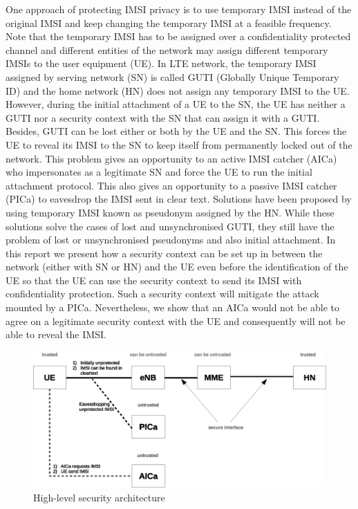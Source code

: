 \documentclass[lnicst,sechang,a4paper]{svmultln}
\begin{document}
One approach of protecting IMSI privacy is to use temporary IMSI instead of the original IMSI and keep changing the temporary IMSI at a feasible frequency. Note that the temporary IMSI has to be assigned over a confidentiality protected channel and different entities of the network may assign different temporary IMSIs to the user equipment (UE). In LTE network, the temporary IMSI assigned by serving network (SN) is called GUTI (Globally Unique Temporary ID) and the home network (HN) does not assign any temporary IMSI to the UE. However, during the initial attachment of a UE to the SN, the UE has neither a GUTI nor a security context with the SN that can assign it with a GUTI. Besides, GUTI can be lost either or both by the UE and the SN. This forces the UE to reveal its IMSI to the SN to keep itself from permanently locked out of the network. This problem gives an opportunity to an active IMSI catcher (AICa) who impersonates as a legitimate SN and force the UE to run the initial attachment protocol. This also gives an opportunity to a passive IMSI catcher (PICa) to eavesdrop the IMSI sent in clear text. Solutions \cite{pseudonym_valtteri_philip, pseudonym_ericsson} have been proposed by using temporary IMSI known as pseudonym assigned by the HN. While these solutions solve the cases of lost and unsynchronised GUTI, they still have the problem of lost or unsynchronised pseudonyms and also initial attachment. In this report we present how a security context can be set up in between the network (either with SN or HN) and the UE even before the identification of the UE so that the UE can use the security context to send its IMSI with confidentiality protection. Such a security context will mitigate the attack mounted by a PICa. Nevertheless, we show that an AICa would not be able to agree on a legitimate security context with the UE and consequently will not be able to reveal the IMSI.

\begin{figure}
\begin{center}
  \includegraphics[width=.98\textwidth]{security_architecture_abstraction.eps}
\caption{High-level security architecture}
\label{fig:security_architecture_abstraction}       %
\end{center}
\end{figure}
\end{document}
